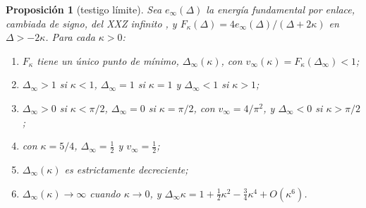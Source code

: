 \documentclass[11pt,a4paper]{article}
\newtheorem{proposicion}[teorema]{Proposición}
\theoremstyle{remark}
\begin{document}
\begin{proposicion}[testigo límite]\label{prop:limite}
Sea $e_\infty(\Delta)$ la energía fundamental por enlace, cambiada de signo, del XXZ infinito
\cite{yang-yang}, y $F_\kappa(\Delta)=4e_\infty(\Delta)/(\Delta+2\kappa)$ en $\Delta>-2\kappa$.
Para cada $\kappa>0$:
\begin{enumerate}
\item[(i)] $F_\kappa$ tiene un único punto de mínimo, $\Delta_\infty(\kappa)$, con
  $v_\infty(\kappa)=F_\kappa(\Delta_\infty)<1$;
\item[(ii)] $\Delta_\infty>1$ si $\kappa<1$, $\Delta_\infty=1$ si $\kappa=1$ y $\Delta_\infty<1$
  si $\kappa>1$;
\item[(iii)] $\Delta_\infty>0$ si $\kappa<\pi/2$, $\Delta_\infty=0$ si $\kappa=\pi/2$, con
  $v_\infty=4/\pi^2$, y $\Delta_\infty<0$ si $\kappa>\pi/2$;
\item[(iv)] con $\kappa=5/4$, $\Delta_\infty=\tfrac12$ y $v_\infty=\tfrac12$;
\item[(v)] $\Delta_\infty(\kappa)$ es estrictamente decreciente;
\item[(vi)] $\Delta_\infty(\kappa)\to\infty$ cuando $\kappa\to0$, y
  $\Delta_\infty\kappa=1+\tfrac12\kappa^2-\tfrac34\kappa^4+O(\kappa^6)$.
\end{enumerate}
\end{proposicion}
\end{document}
